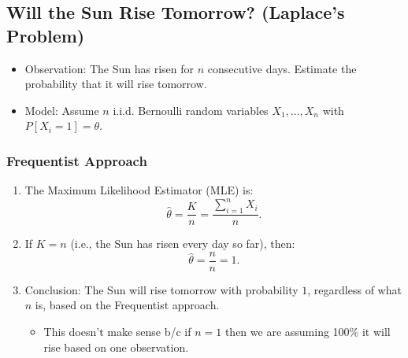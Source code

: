 \subsection{Will the Sun Rise Tomorrow? (Laplace's Problem)}
\begin{example}
    \begin{itemize}
        \item Observation: The Sun has risen for $n$ consecutive days. Estimate the probability that it will rise tomorrow.
        \item Model: Assume $n$ i.i.d. Bernoulli random variables $X_1, \dots, X_n$ with $P[X_i = 1] = \theta$.
    \end{itemize}
\end{example}
\subsubsection{Frequentist Approach}
\begin{example}
    \begin{enumerate}
        \item The Maximum Likelihood Estimator (MLE) is:
        \[
        \hat{\theta} = \frac{K}{n} = \frac{\sum_{i=1}^n X_i}{n}.
        \]
        \item If $K = n$ (i.e., the Sun has risen every day so far), then:
        \[
        \hat{\theta} = \frac{n}{n} = 1.
        \]
        \item Conclusion: The Sun will rise tomorrow with probability $1$, regardless of what $n$ is, based on the Frequentist approach. 
        \begin{itemize}
            \item This doesn't make sense b/c if $n=1$ then we are assuming 100\% it will rise based on one observation.
        \end{itemize}
    \end{enumerate}
\end{example}

